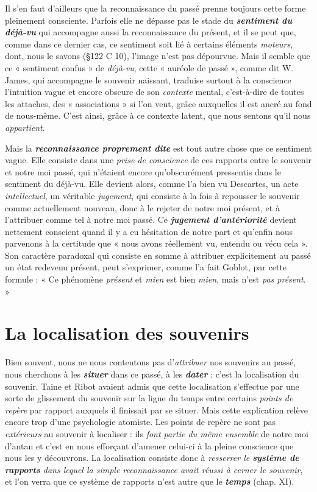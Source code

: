 Il s’en faut d’ailleurs que la reconnaissance du passé prenne toujours
cette forme pleinement consciente. Parfois elle ne dépasse pas
le stade du \textbf{\textit {sentiment du déjà-vu}} qui accompagne aussi la reconnaissance
du présent, et il se peut que, comme dans ce dernier cas,
ce sentiment soit lié à certains éléments {\it moteurs}, dont, nous le savons
(\S 122 C 10), l’image n’est pas dépourvue. Mais il semble que ce
« sentiment confus » de {\it déjà-vu}, cette « auréole de passé », comme dit
W. James, qui accompagne le souvenir naissant, traduise surtout à
la conscience l'intuition vague et encore obscure de son {\it contexte} mental,
c’est-à-dire de toutes les attaches, des « associations » si l’on veut,
grâce auxquelles il est ancré au fond de nous-même. C’est ainsi, grâce
à ce contexte latent, que nous sentons qu’il nous {\it appartient}.

Mais la \textbf{\textit {reconnaissance proprement dite}} est tout autre chose que
ce sentiment vague. Elle consiste dans une {\it prise de conscience} de ces
rapports entre le souvenir et notre moi passé, qui n'étaient encore
qu’obscurément pressentis dans le sentiment du déjà-vu. Elle devient
alors, comme l’a bien vu Descartes, un acte {\it intellectuel}, un véritable
{\it jugement}, qui consiste à la fois à repousser le souvenir comme actuellement
nouveau, donc à le rejeter de notre moi présent, et à l’attribuer
comme tel à notre moi passé. Ce \textbf{\textit {jugement d’antériorité}} devient
nettement conscient quand il y a eu hésitation de notre part et
qu’enfin nous parvenons à la certitude que « nous avons réellement
vu, entendu ou vécu cela ». Son caractère paradoxal qui consiste en
somme à attribuer explicitement au passé un état redevenu présent,
peut s’exprimer, comme l’a fait Goblot, par cette formule : « Ce phénomène
{\it présent} et {\it mien} est bien {\it mien}, mais n’est {\it pas présent}. »

\section{La localisation des souvenirs}%
Bien souvent, nous
ne nous contentons pas d'{\it attribuer} nos souvenirs au passé, nous cherchons
à les \textbf{\textit {situer}} dans ce passé, à les \textbf{\textit {dater}} : c’est la localisation du
souvenir. Taine et Ribot avaient admis que cette localisation s’effectue
par une sorte de glissement du souvenir sur la ligne du temps
entre certains {\it points de repère} par rapport auxquels il finissait par se
situer. Mais cette explication relève encore trop d’une psychologie
atomiste. Les points de repère ne sont pas {\it extérieurs} au souvenir à
localiser : ils {\it font partie du même ensemble} de notre moi d’antan et
c’est en nous efforçant d'amener celui-ci à la pleine conscience que
nous les y découvrons. La localisation consiste donc à {\it resserrer le
\textbf{\textit {système de rapports}} dans lequel la simple reconnaissance avait réussi
à cerner le souvenir}, et l’on verra que ce système de rapports n’est
autre que le \textbf{\textit {temps}} (chap. XI).

